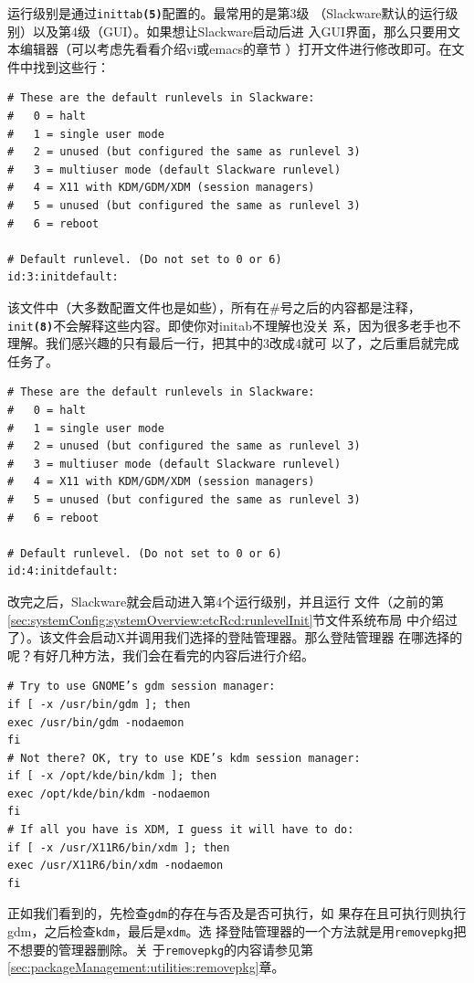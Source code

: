 运行级别是通过\texttt{inittab\textbf{(5)}}配置的。最常用的是第3级
（Slackware默认的运行级别）以及第4级（GUI）。如果想让Slackware启动后进
入GUI界面，那么只要用文本编辑器（可以考虑先看看介绍vi或emacs的章节
）打开文件进行修改即可。在文件中找到这些行：
\begin{Verbatim}[frame=single, commandchars=\\\{\}]
# These are the default runlevels in Slackware:
#   0 = halt
#   1 = single user mode
#   2 = unused (but configured the same as runlevel 3)
#   3 = multiuser mode (default Slackware runlevel)
#   4 = X11 with KDM/GDM/XDM (session managers)
#   5 = unused (but configured the same as runlevel 3)
#   6 = reboot

# Default runlevel. (Do not set to 0 or 6)
id:3:initdefault:
\end{Verbatim}
该文件中（大多数配置文件也是如些），所有在\#号之后的内容都是注释，
\texttt{init\textbf{(8)}}不会解释这些内容。即使你对initab不理解也没关
系，因为很多老手也不理解。我们感兴趣的只有最后一行，把其中的3改成4就可
以了，之后重启就完成任务了。
\begin{Verbatim}[frame=single, commandchars=\\\{\}]
# These are the default runlevels in Slackware:
#   0 = halt
#   1 = single user mode
#   2 = unused (but configured the same as runlevel 3)
#   3 = multiuser mode (default Slackware runlevel)
#   4 = X11 with KDM/GDM/XDM (session managers)
#   5 = unused (but configured the same as runlevel 3)
#   6 = reboot

# Default runlevel. (Do not set to 0 or 6)
id:4:initdefault:
\end{Verbatim}

改完之后，Slackware就会启动进入第4个运行级别，并且运行
文件（之前的第
\ref{sec:systemConfig:systemOverview:etcRcd:runlevelInit}节文件系统布局
中介绍过了）。该文件会启动X并调用我们选择的登陆管理器。那么登陆管理器
在哪选择的呢？有好几种方法，我们会在看完的内容后进行介绍。
\begin{Verbatim}[frame=single, commandchars=\\\{\}]
# Try to use GNOME’s gdm session manager:
if [ -x /usr/bin/gdm ]; then
exec /usr/bin/gdm -nodaemon
fi
# Not there? OK, try to use KDE’s kdm session manager:
if [ -x /opt/kde/bin/kdm ]; then
exec /opt/kde/bin/kdm -nodaemon
fi
# If all you have is XDM, I guess it will have to do:
if [ -x /usr/X11R6/bin/xdm ]; then
exec /usr/X11R6/bin/xdm -nodaemon
fi
\end{Verbatim}
正如我们看到的，先检查\texttt{gdm}的存在与否及是否可执行，如
果存在且可执行则执行gdm，之后检查\texttt{kdm}，最后是\texttt{xdm}。选
择登陆管理器的一个方法就是用\texttt{removepkg}把不想要的管理器删除。关
于\texttt{removepkg}的内容请参见第
\ref{sec:packageManagement:utilities:removepkg}章。

